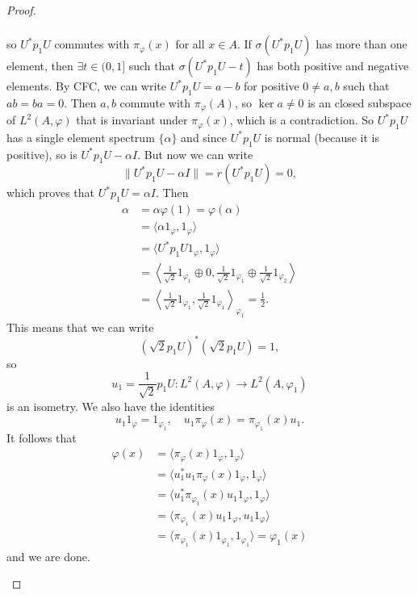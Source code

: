 \documentclass[10pt, a4paper]{article}
\newenvironment{noticeC}{%
  \tcolorbox[%
  notitle,
  empty,
  enhanced,  %
  breakable,
  coltext=black, 
  fontupper=\rmfamily,
  noparskip,
  sharp corners,
  boxrule=-1pt,  %
  frame hidden,
  left=7pt,  %
  right=7pt,
  top=5pt,
  bottom=5pt,
  before skip=2.5ex plus 2pt,
  after skip=2.5ex plus 2pt,
  overlay unbroken and last={%
  },
  ]}
{\endtcolorbox}
\newenvironment{myproof}%
  {\begin{noticeC}\begin{proof}}%
  {\end{proof}\end{noticeC}}
\begin{document}
\begin{myproof}
\begin{itemize}
\begin{align*}
    \end{align*}
    so $U^* p_1 U$ commutes with $\pi_{\varphi} (x)$ for all $x \in A$.
    If $\sigma(U^* p_1 U)$ has more than one element, then $\exists t \in (0, 1]$
    such that $\sigma(U^* p_1 U - t)$ has both positive and negative elements.
    By CFC, we can write $U^* p_1 U = a - b$ for positive $0 \neq a, b$ such that $ab = ba = 0$.
    Then $a, b$ commute with $\pi_{\varphi} (A)$, so $\ker a \neq 0$ is an closed subspace of $L^2 (A, \varphi)$ that is invariant under $\pi_{\varphi} (x)$, which is a contradiction.
    So $U^* p_1 U$ has a single element spectrum $\{\alpha\}$ and since $U^* p_1 U$ is normal (because it is positive), so is $U^* p_1 U - \alpha I.$
    But now we can write 
    $$\| U^* p_1 U - \alpha I\| = r(U^* p_1 U) = 0,$$
    which proves that $U^* p_1 U = \alpha I$.
    Then
    \begin{align*}
      \alpha &= \alpha \varphi(1) = \varphi(\alpha)\\
      &= \langle \alpha 1_{\varphi}, 1_{\varphi} \rangle\\
      &= \langle U^* p_1 U 1_\varphi, 1_\varphi\rangle \\
      &= \left\langle \frac{1}{\sqrt{2}} 1_{\varphi_1} \oplus 0, \frac{1}{\sqrt{2}} 1_{\varphi_1} \oplus \frac{1}{\sqrt{2}} 1_{\varphi_2}\right\rangle \\
      &= \left\langle \frac{1}{\sqrt{2}} 1_{\varphi_1}, \frac{1}{\sqrt{2}} 1_{\varphi_1} \right\rangle _{\varphi_1} = \frac{1}{2}.
    \end{align*}
    This means that we can write 
    $$\left({\sqrt{2}} p_1 U \right)^* \left({\sqrt{2}} p_1 U \right) = 1,$$
    so $$u_1 = \frac{1}{\sqrt{2}} p_1 U : L^2 (A, \varphi) \to L^2 (A, \varphi_1)$$
    is an isometry. We also have the identities
    $$u_1 1_{\varphi} = 1_{\varphi_1},\quad u_1 \pi_{\varphi} (x) = \pi_{\varphi_1} (x) u_1.$$
    It follows that 
    \begin{align*}
      \varphi(x) &= \langle \pi_{\varphi} (x) 1_{\varphi}, 1_\varphi \rangle\\
      &= \langle u_1 ^* u_1 \pi_\varphi (x) 1_\varphi, 1_\varphi\rangle\\
      &= \langle u_1 ^* \pi_{\varphi_1} (x) u_1 1_\varphi, 1_\varphi\rangle\\
      &= \langle \pi_{\varphi_1} (x) u_1 1_\varphi, u_1 1_\varphi\rangle\\
      &= \langle \pi_{\varphi_1} (x) 1_{\varphi_1}, 1_{\varphi_1} \rangle = \varphi_1(x)
    \end{align*}
    and we are done. \qedhere
  \end{itemize}
\end{myproof}
\end{document}
